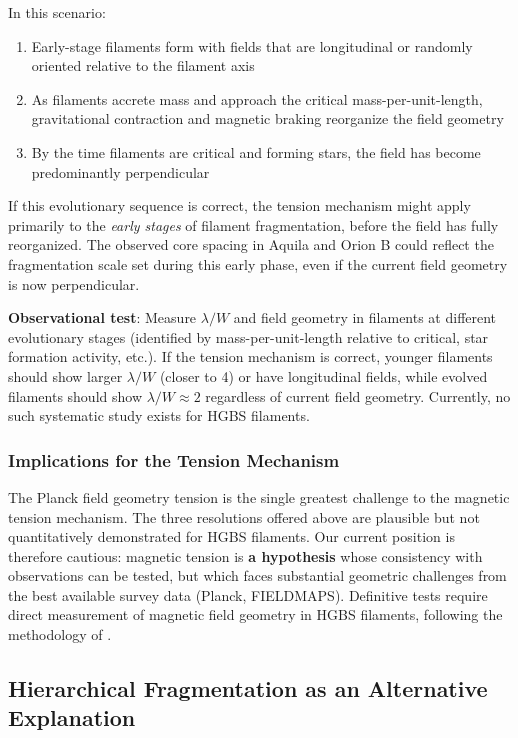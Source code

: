 \documentclass[11pt,a4paper]{article}
\begin{document}
In this scenario:
\begin{enumerate}
    \item Early-stage filaments form with fields that are longitudinal or randomly oriented relative to the filament axis
    \item As filaments accrete mass and approach the critical mass-per-unit-length, gravitational contraction and magnetic braking reorganize the field geometry
    \item By the time filaments are critical and forming stars, the field has become predominantly perpendicular
\end{enumerate}

If this evolutionary sequence is correct, the tension mechanism might apply primarily to the \emph{early stages} of filament fragmentation, before the field has fully reorganized. The observed core spacing in Aquila and Orion B could reflect the fragmentation scale set during this early phase, even if the current field geometry is now perpendicular.

\textbf{Observational test}: Measure $\lambda/W$ and field geometry in filaments at different evolutionary stages (identified by mass-per-unit-length relative to critical, star formation activity, etc.). If the tension mechanism is correct, younger filaments should show larger $\lambda/W$ (closer to 4) or have longitudinal fields, while evolved filaments should show $\lambda/W \approx 2$ regardless of current field geometry. Currently, no such systematic study exists for HGBS filaments.

\subsubsection{Implications for the Tension Mechanism}

The Planck field geometry tension is the single greatest challenge to the magnetic tension mechanism. The three resolutions offered above are plausible but not quantitatively demonstrated for HGBS filaments. Our current position is therefore cautious: magnetic tension is \textbf{a hypothesis} whose consistency with observations can be tested, but which faces substantial geometric challenges from the best available survey data (Planck, FIELDMAPS). Definitive tests require direct measurement of magnetic field geometry in HGBS filaments, following the methodology of \citet{Jadhav2026}.

\subsection{Hierarchical Fragmentation as an Alternative Explanation}
\label{sec:hierarchical}
\end{document}
